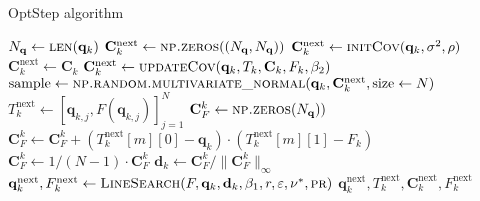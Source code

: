 \begin{algorithm}[H]%
\caption{OptStep algorithm}
\begin{algorithmic}[1]
\State $N_\mathbf{q}\gets\Call{len}{\mathbf{q}_k}$
\State $\mathbf{C}^\mathrm{next}_k \gets \Call{np.zeros}{(N_\mathbf{q}, N_\mathbf{q})}$
\State $\mathbf{C}^\mathrm{next}_k \gets \Call{initCov}{\mathbf{q}_k, \sigma^2, \rho}$
\Else
\State $\mathbf{C}^\mathrm{next}_k \gets \mathbf{C}_k$
\EndIf
\Else
\State $\mathbf{C}^\mathrm{next}_k \gets \Call{updateCov}{\mathbf{q}_k, T_k, \mathbf{C}_k, F_k ,\beta_2}$
\EndIf
\State $\mathrm{sample} \gets \Call{np.random.multivariate\_normal}{\mathbf{q}_k, \mathbf{C}^\mathrm{next}_k, \mathrm{size} \gets N}$
\State $T^\mathrm{next}_k\gets[\mathbf{q}_{k,j},F(\mathbf{q}_{k,j})]_{j=1}^N$
\State $\mathbf{C}^k_F \gets \Call{np.zeros}{N_\mathbf{q})}$
\State $\mathbf{C}^k_F \gets \mathbf{C}^k_F+(T^\mathrm{next}_k[m][0]-\mathbf{q}_k)\cdot(T^\mathrm{next}_k[m][1]-F_k)$
\EndFor
\State $\mathbf{C}^k_F \gets 1/(N-1)\cdot\mathbf{C}^k_F$
\State $\mathbf{d}_k \gets \mathbf{C}^k_F/\|\mathbf{C}^k_F\|_\infty$
\State $\mathbf{q}^\mathrm{next}_{k}, F^\mathrm{next}_k \gets \Call{LineSearch}{F,\mathbf{q}_k,\mathbf{d}_k,\beta_1,r,\varepsilon,\nu^*,\textproc{pr}}$
\State \Return $\mathbf{q}^\mathrm{next}_k,T^\mathrm{next}_k,\mathbf{C}^\mathrm{next}_k,F^\mathrm{next}_k$
\EndFunction
\end{algorithmic}
\end{algorithm}

